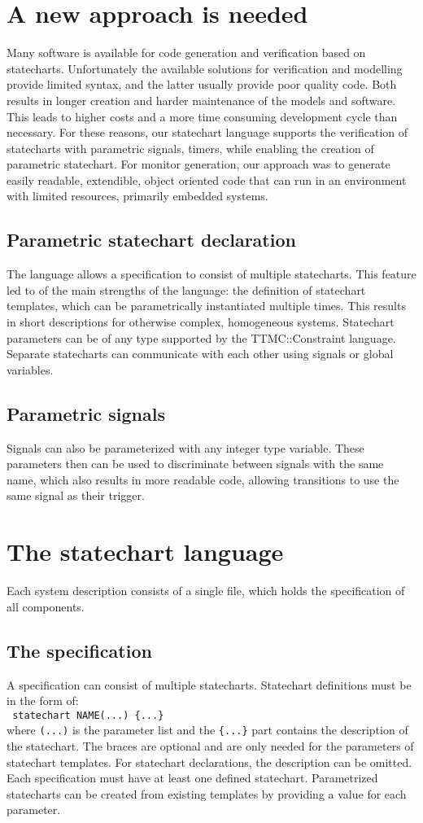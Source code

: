 \section{A new approach is needed}
Many software is available for code generation and verification based on statecharts. Unfortunately the available solutions for verification and modelling provide limited syntax, and the latter usually provide poor quality code. Both results in longer creation and harder maintenance of the models and software. This leads to higher costs and a more time consuming development cycle than necessary. For these reasons, our statechart language supports the verification of statecharts with parametric signals, timers, while enabling the creation of parametric statechart. For monitor generation, our approach was to generate easily readable, extendible, object oriented code that can run in an environment with limited resources, primarily embedded systems.
  \subsection{Parametric statechart declaration}
The language allows a specification to consist of multiple statecharts. This feature led to of the main strengths of the language: the definition of statechart templates, which can be parametrically instantiated multiple times. This results in short descriptions for otherwise complex, homogeneous systems. Statechart parameters can be of any type supported by the TTMC::Constraint language. Separate statecharts can communicate with each other using signals or global variables.
  \subsection{Parametric signals}
Signals can also be parameterized with any integer type variable. These parameters then can be used to discriminate between signals with the same name, which also results in more readable code, allowing transitions to use the same signal as their trigger.
\section{The statechart language}
Each system description consists of a single file, which holds the specification of all components.
  \subsection{The specification}
A specification can consist of multiple statecharts. Statechart definitions must be in the form of: \\\verb! statechart NAME(...) {...}!\\ where \verb!(...)! is the parameter list and the \verb!{...}! part contains the description of the statechart. The braces are optional and are only needed for the parameters of statechart templates. For statechart declarations, the description can be omitted. Each specification must have at least one defined statechart. Parametrized statecharts can be created from existing templates by providing a value for each parameter.
